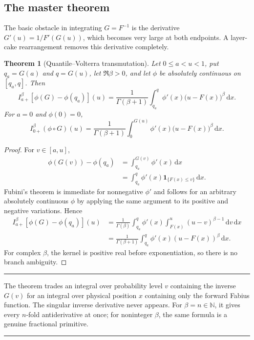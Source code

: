 \documentclass[11pt,oneside]{article}
\newtheorem{theorem}{Theorem}[section]
\theoremstyle{definition}
\theoremstyle{remark}
\newcommand{\N}{\mathbb N}
\newcommand{\dd}{\,\mathrm d}
\newcommand{\ind}{\mathbf 1}
\newenvironment{boxedresult}{%
  \par\smallskip\noindent\begin{center}\begin{minipage}{0.94\textwidth}%
  \hrule\vspace{0.65em}\small
}{%
  \vspace{0.65em}\hrule\end{minipage}\end{center}\smallskip
}
\begin{document}
\subsection{The master theorem}

The basic obstacle in integrating $G=F^{-1}$ is the derivative
$G'(u)=1/F'(G(u))$, which becomes very large at both endpoints.  A layer-cake
rearrangement removes this derivative completely.

\begin{theorem}[Quantile--Volterra transmutation]
\label{thm:quantile-transmutation}
Let $0\le a<u<1$, put $q_a=G(a)$ and $q=G(u)$, let $\Re\beta>0$, and let
$\phi$ be absolutely continuous on $[q_a,q]$.  Then
\begin{equation}
 I_{a+}^{\beta}\!\left[\phi(G)-\phi(q_a)\right](u)
 =\frac1{\Gamma(\beta+1)}
  \int_{q_a}^{q}\phi'(x)\bigl(u-F(x)\bigr)^\beta\dd x.
 \label{eq:quantile-transmutation}
\end{equation}
For $a=0$ and $\phi(0)=0$,
\begin{equation}
 I_{0+}^{\beta}(\phi\circ G)(u)
 =\frac1{\Gamma(\beta+1)}
  \int_0^{G(u)}\phi'(x)\bigl(u-F(x)\bigr)^\beta\dd x.
 \label{eq:quantile-transmutation-zero}
\end{equation}
\end{theorem}

\begin{proof}
For $v\in[a,u]$,
\begin{align}
 \phi(G(v))-\phi(q_a)
 &=\int_{q_a}^{G(v)}\phi'(x)\dd x\\
 &=\int_{q_a}^{q}\phi'(x)\ind_{\{F(x)\le v\}}\dd x.
\end{align}
Fubini's theorem is immediate for nonnegative $\phi'$ and follows for an
arbitrary absolutely continuous $\phi$ by applying the same argument to its
positive and negative variations.  Hence
\begin{align}
 I_{a+}^{\beta}[\phi(G)-\phi(q_a)](u)
 &=\frac1{\Gamma(\beta)}
   \int_{q_a}^{q}\phi'(x)
   \int_{F(x)}^u(u-v)^{\beta-1}\dd v\dd x\\
 &=\frac1{\Gamma(\beta+1)}
   \int_{q_a}^{q}\phi'(x)(u-F(x))^\beta\dd x.
\end{align}
For complex $\beta$, the kernel is positive real before exponentiation, so
there is no branch ambiguity.
\end{proof}

\begin{boxedresult}
The theorem trades an integral over probability level $v$ containing the
inverse $G(v)$ for an integral over physical position $x$ containing only the
forward Fabius function.  The singular inverse derivative never appears.
For $\beta=n\in\N$, it gives every $n$-fold antiderivative at once; for
noninteger $\beta$, the same formula is a genuine fractional primitive.
\end{boxedresult}
\end{document}
